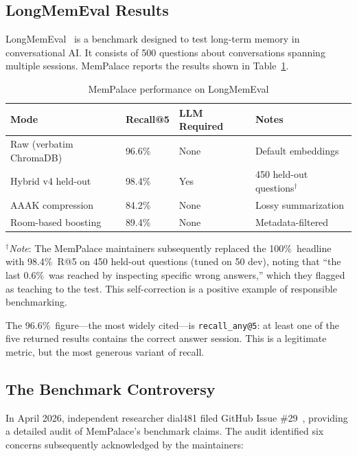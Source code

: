 \documentclass[twoside,11pt]{article}
\begin{document}
\subsection{LongMemEval Results}

LongMemEval~\citep{longmemeval} is a benchmark designed to test long-term
memory in conversational AI.  It consists of 500 questions about conversations
spanning multiple sessions.  MemPalace reports the results shown in
Table~\ref{tab:longmemeval}.

\begin{table}[t]
\centering
\caption{MemPalace performance on LongMemEval}
\label{tab:longmemeval}
\begin{tabular}{@{}llll@{}}
\toprule
\textbf{Mode} & \textbf{Recall@5} & \textbf{LLM Required} & \textbf{Notes} \\
\midrule
Raw (verbatim ChromaDB) & 96.6\%   & None & Default embeddings \\
Hybrid v4 held-out      & 98.4\%  & Yes  & 450 held-out questions$^{\dagger}$ \\
AAAK compression        & 84.2\%   & None & Lossy summarization \\
Room-based boosting     & 89.4\%   & None & Metadata-filtered \\
\bottomrule
\end{tabular}
\end{table}

\noindent$^{\dagger}$\textit{Note}: The MemPalace maintainers subsequently
replaced the 100\%\ headline with 98.4\%\ R@5 on 450 held-out questions
(tuned on 50 dev), noting that ``the last 0.6\%\ was reached by inspecting
specific wrong answers,'' which they flagged as teaching to the test.  This
self-correction is a positive example of responsible benchmarking.

The 96.6\%\ figure---the most widely cited---is \texttt{recall\_any@5}: at
least one of the five returned results contains the correct answer session.
This is a legitimate metric, but the most generous variant of recall.

\subsection{The Benchmark Controversy}
\label{sec:controversy}

In April 2026, independent researcher dial481 filed GitHub Issue \#29~\citep{issue29},
providing a detailed audit of MemPalace's benchmark claims.  The audit
identified six concerns subsequently acknowledged by the maintainers:
\end{document}
